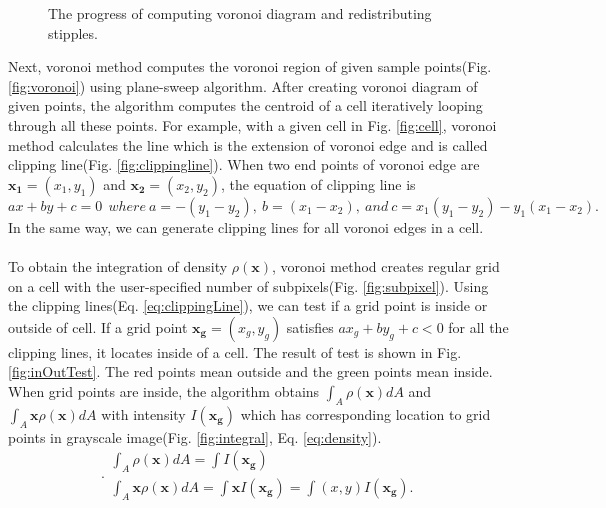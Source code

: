 \documentclass[11pt]{article}
\begin{document}
\begin{figure}[thb]
{    \label{fig:inOutTest}
  }\hspace{-3mm}
  \hspace{-3mm}
    \caption{The progress of computing voronoi diagram and redistributing stipples. \label{fig:createVoronoi}}
\end{figure}
Next, voronoi method computes the voronoi region of given sample points(Fig. \ref{fig:voronoi}) using plane-sweep algorithm.
After creating voronoi diagram of given points, the algorithm computes the centroid of a cell iteratively looping through all these points.
For example, with a given cell in Fig. \ref{fig:cell}, voronoi method calculates the line which is the extension of voronoi edge and is called clipping line(Fig. \ref{fig:clippingline}).
When two end points of voronoi edge are $\mathbf{x_1}=(x_1,y_1)$ and $\mathbf{x_2}=(x_2,y_2)$, the equation of clipping line is
\begin{equation}\label{eq:clippingLine}
ax+by+c=0\:\:where\:a=-(y_1-y_2),\:b=(x_1-x_2),\:and\:c=x_1(y_1-y_2)-y_1(x_1-x_2).
\end{equation}
In the same way, we can generate clipping lines for all voronoi edges in a cell.\\\\
To obtain the integration of density $\rho(\mathbf{x})$, voronoi method creates regular grid on a cell with the user-specified number of subpixels(Fig. \ref{fig:subpixel}).
Using the clipping lines(Eq. \ref{eq:clippingLine}), we can test if a grid point is inside or outside of cell. If a grid point $\mathbf{x_g}=(x_g, y_g)$ satisfies $ax_g+by_g+c<0$ for all the clipping lines, it locates inside of a cell. The result of test is shown in Fig. \ref{fig:inOutTest}. The red points mean outside and the green points mean inside.
\\When grid points are inside, the algorithm obtains $\int_{A}\rho(\mathbf{x})dA$ and $\int_{A}\mathbf{x}\rho(\mathbf{x})dA$ with intensity $I(\mathbf{x_g})$ which has corresponding location to grid points in grayscale image(Fig. \ref{fig:integral}, Eq. \ref{eq:density}).
\begin{equation}\label{eq:density} .
\begin{gathered}
\int_{A}\rho(\mathbf{x})dA=\int I(\mathbf{x_g})\\
\int_{A}\mathbf{x}\rho(\mathbf{x})dA=\int \mathbf{x}I(\mathbf{x_g})=\int (x, y)I(\mathbf{x_g}).
\end{gathered}
\end{equation}
\end{document}
